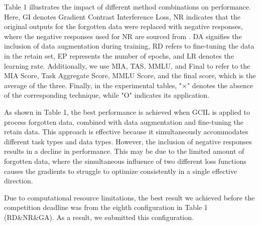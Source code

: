 \documentclass[11pt]{article}
\begin{document}
Table 1 illustrates the impact of different method combinations on performance. Here, GI denotes Gradient Contrast Interference Loss, NR indicates that the original outputs for the forgotten data were replaced with negative responses, where the negative responses used for NR are sourced from \citep{tofu2024}. DA signifies the inclusion of data augmentation during training, RD refers to fine-tuning the data in the retain set, EP represents the number of epochs, and LR denotes the learning rate. Additionally, we use MIA, TAS, MMLU, and Final to refer to the MIA Score, Task Aggregate Score, MMLU Score, and the final score, which is the average of the three. Finally, in the experimental tables, "×" denotes the absence of the corresponding technique, while "O" indicates its application.


As shown in Table 1, the best performance is achieved when GCIL is applied to process forgotten data, combined with data augmentation and fine-tuning the retain data. This approach is effective because it simultaneously accommodates different task types and data types. However, the inclusion of negative responses results in a decline in performance. This may be due to the limited amount of forgotten data, where the simultaneous influence of two different loss functions causes the gradients to struggle to optimize consistently in a single effective direction.


Due to computational resource limitations, the best result we achieved before the competition deadline was from the eighth configuration in Table 1 (RD\&NR\&GA). As a result, we submitted this configuration.


\end{document}
